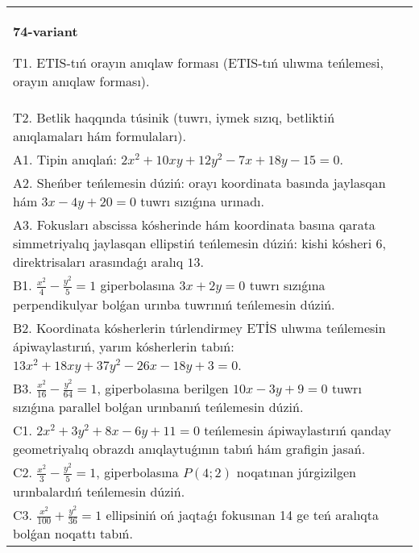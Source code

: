 \documentclass{article}
\begin{document}
\begin{tabular}{m{17cm}}
\textbf{74-variant}
\newline

T1. ETIS-tıń orayın anıqlaw forması (ETIS-tıń ulıwma teńlemesi, orayın anıqlaw forması).\\

T2. Betlik haqqında túsinik (tuwrı, iymek sızıq, betliktiń anıqlamaları hám formulaları).\\

A1. Tipin anıqlań: $2 x^{2}+10 xy+12 y^{2}-7 x+18 y-15=0$.\\

A2. Sheńber teńlemesin dúziń: orayı koordinata basında jaylasqan hám $3 x-4 y+20=0$ tuwrı sızıǵına urınadı.\\

A3. Fokusları abscissa kósherinde hám koordinata basına qarata simmetriyalıq jaylasqan ellipstiń teńlemesin dúziń: kishi kósheri $6$, direktrisaları arasındaǵı aralıq $13$.\\

B1. $\frac{x^{2}}{4} - \frac{y^{2}}{5} = 1$ giperbolasına $3x + 2y = 0$ tuwrı sızıǵına perpendikulyar bolǵan urınba tuwrınıń teńlemesin dúziń.\\

B2. Koordinata kósherlerin túrlendirmey ETİS ulıwma teńlemesin ápiwaylastırıń, yarım kósherlerin tabıń: $13x^{2} + 18xy + 37y^{2} - 26x - 18y + 3 = 0$.  \\

B3. $\frac{x^{2}}{16} - \frac{y^{2}}{64} = 1$, giperbolasına berilgen $10x - 3y + 9 = 0$ tuwrı sızıǵına parallel bolǵan urınbanıń teńlemesin dúziń.  \\

C1. $2x^{2} + 3y^{2} + 8x - 6y + 11 = 0$ teńlemesin ápiwaylastırıń qanday geometriyalıq obrazdı anıqlaytuǵının tabıń hám grafigin jasań.  \\

C2. $\frac{x^{2}}{3} - \frac{y^{2}}{5} = 1$, giperbolasına $P(4;2)$ noqatınan júrgizilgen urınbalardıń teńlemesin dúziń.  \\

C3. $\frac{x^{2}}{100} + \frac{y^{2}}{36} = 1$ ellipsiniń oń jaqtaǵı fokusınan 14 ge teń aralıqta bolǵan noqattı tabıń.  \\

\end{tabular}
\vspace{1cm}
\end{document}

